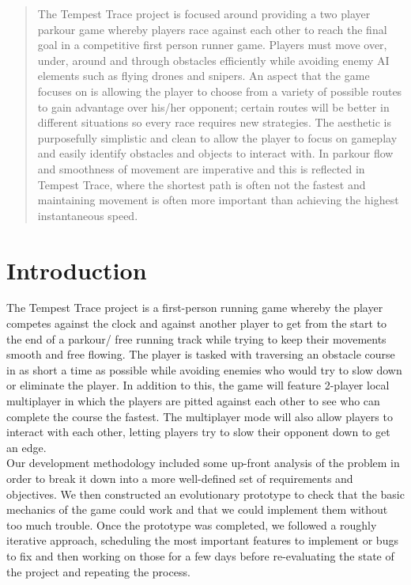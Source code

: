 \documentclass[11pt,a4paper]{article}
\begin{document}
\begin{abstract}
The Tempest Trace project is focused around providing a two player parkour game whereby players race against each other to reach the final goal in a competitive first person runner game. Players must move over, under, around and through obstacles efficiently while avoiding enemy AI elements such as flying drones and snipers. An aspect that the game focuses on is allowing the player to choose from a variety of possible routes to gain advantage over his/her opponent; certain routes will be better in different situations so every race requires new strategies. The aesthetic is purposefully simplistic and clean to allow the player to focus on gameplay and easily identify obstacles and objects to interact with. In parkour flow and smoothness of movement are imperative and this is reflected in Tempest Trace, where the shortest path is often not the fastest and maintaining movement is often more important than achieving the highest instantaneous speed.
\end{abstract}

\section{Introduction}
\label{s:introduction}
The Tempest Trace project is a first-person running game whereby the player competes against the clock and against another player to get from the start to the end of a parkour/ free running track while trying to keep their movements smooth and free flowing. The player is tasked with traversing an obstacle course in as short a time as possible while avoiding enemies who would try to slow down or eliminate the player. In addition to this, the game will feature 2-player local multiplayer in which the players are pitted against each other to see who can complete the course the fastest. The multiplayer mode will also allow players to interact with each other, letting players try to slow their opponent down to get an edge. \\
Our development methodology included some up-front analysis of the problem in order to break it down into a more well-defined set of requirements and objectives. We then constructed an evolutionary prototype to check that the basic mechanics of the game could work and that we could implement them without too much trouble. Once the prototype was completed, we followed a roughly iterative approach, scheduling the most important features to implement or bugs to fix and then working on those for a few days before re-evaluating the state of the project and repeating the process.
\end{document}

